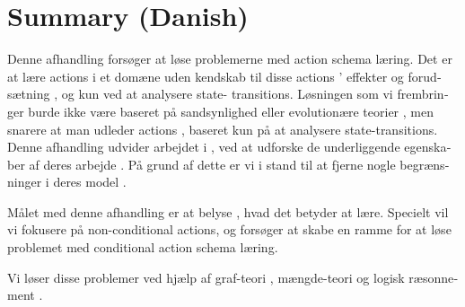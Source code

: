 \chapter{Summary (Danish)}
\begin{otherlanguage}{danish}

Denne afhandling forsøger at løse problemerne med action schema læring.
Det er at lære actions i et domæne uden kendskab til disse actions ' effekter og forudsætning , og kun ved at analysere  state- transitions. Løsningen som vi frembringer burde ikke være baseret på sandsynlighed eller evolutionære teorier , men snarere at man udleder actions , baseret kun på at analysere state-transitions.
Denne afhandling udvider arbejdet i \cite{Walsh2008} ,
ved at udforske de underliggende egenskaber af deres arbejde .
På grund af dette er vi i stand til at fjerne nogle begrænsninger i deres model .

Målet med denne afhandling er at belyse , hvad det betyder at lære. Specielt vil vi fokusere på non-conditional actions, og forsøger at skabe en ramme for at løse problemet med conditional action schema læring.

Vi løser disse problemer ved hjælp af graf-teori , mængde-teori og logisk ræsonnement .


\end{otherlanguage}